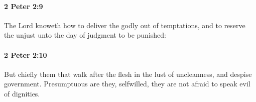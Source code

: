		\paragraph{2 Peter 2:9} %
			\label{2PETER-2-9}

			The Lord knoweth how to deliver the godly out of temptations, and to reserve the unjust unto the day of judgment to be punished:

			\begin{framed}
			\scriptsize
				\begin{compactdesc}
					\item[SBLG] 
				\end{compactdesc}
			\end{framed}

		\paragraph{2 Peter 2:10} %
			\label{2PETER-2-10}

			But chiefly them that walk after the flesh in the lust of uncleanness, and despise government.  Presumptuous are they, selfwilled, they are not afraid to speak evil of dignities.

